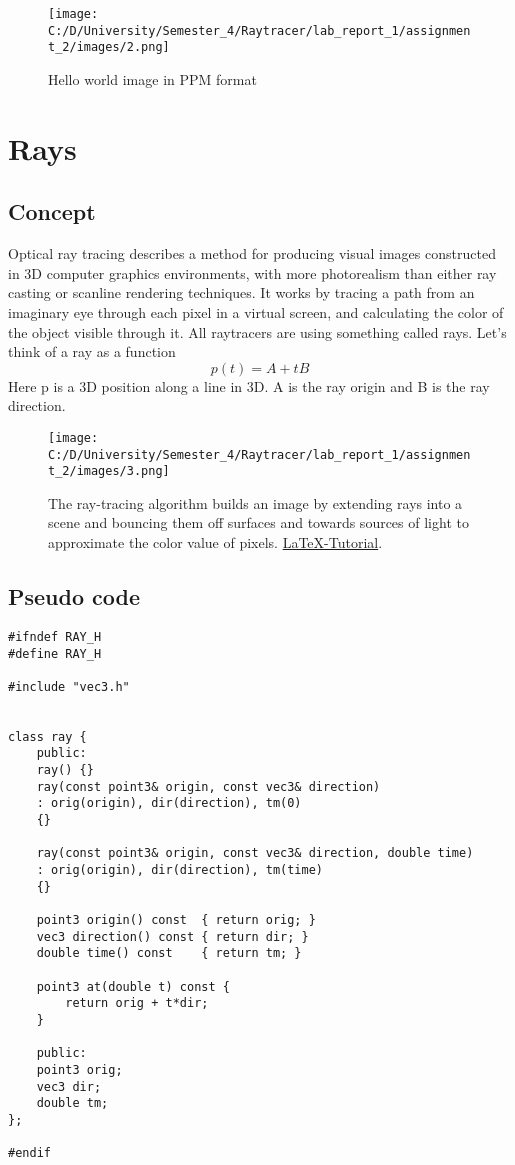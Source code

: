 \documentclass{article}
\begin{document}
\begin{figure}[H]
	\begin{center}
		\texttt{[image: C:/D/University/Semester\_4/Raytracer/lab\_report\_1/assignment\_2/images/2.png]}
		
		\caption{Hello world image in PPM format}
		\label{fig:boat1}
	\end{center}
\end{figure}
 \clearpage

\section{Rays}
\subsection{Concept}
Optical ray tracing describes a method for producing visual images constructed in 3D computer graphics environments, with more photorealism than either ray casting or scanline rendering techniques. It works by tracing a path from an imaginary eye through each pixel in a virtual screen, and calculating the color of the object visible through it.
All raytracers are using something called rays. Let’s think of a ray as a function \[p (t) = A + tB\] Here p is a 3D position along a line
in 3D. A is the ray origin and B is the ray direction.

\begin{figure}[H]
	
	\texttt{[image: C:/D/University/Semester\_4/Raytracer/lab\_report\_1/assignment\_2/images/3.png]}
	
	\caption{The ray-tracing algorithm builds an image by extending rays into a scene and bouncing them off surfaces and towards sources of light to approximate the color value of pixels. \href{https://en.wikipedia.org/wiki/Ray_tracing_(graphics)}{LaTeX-Tutorial}.}
	\label{fig:boat1}
\end{figure}

\subsection{Pseudo code}
\begin{lstlisting}
#ifndef RAY_H
#define RAY_H

#include "vec3.h"


class ray {
	public:
	ray() {}
	ray(const point3& origin, const vec3& direction)
	: orig(origin), dir(direction), tm(0)
	{}
	
	ray(const point3& origin, const vec3& direction, double time)
	: orig(origin), dir(direction), tm(time)
	{}
	
	point3 origin() const  { return orig; }
	vec3 direction() const { return dir; }
	double time() const    { return tm; }
	
	point3 at(double t) const {
		return orig + t*dir;
	}
	
	public:
	point3 orig;
	vec3 dir;
	double tm;
};

#endif
\end{lstlisting}
\end{document}
